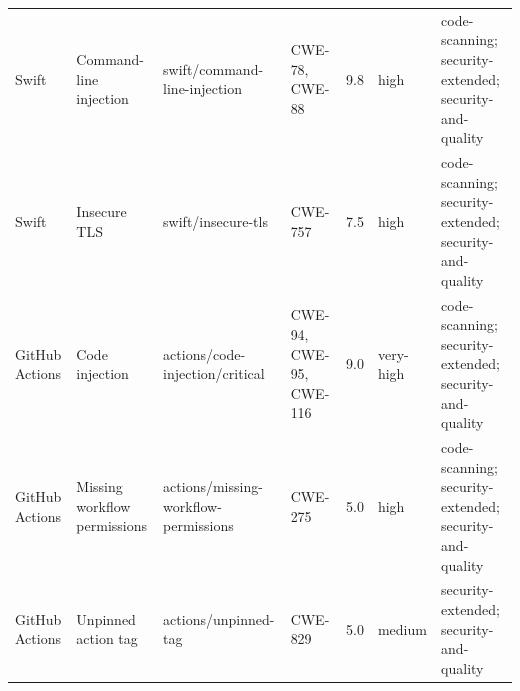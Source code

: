 \documentclass[10pt,letterpaper]{article}
\begin{document}
\begin{landscape}
\begin{longtable}{@{}P{0.9in}P{1.25in}P{1.85in}P{1.0in}P{0.7in}P{0.55in}P{2.15in}@{}}
Swift & Command-line injection & swift/command-line-injection & CWE-78, CWE-88 & 9.8 & high & code-scanning; security-extended; security-and-quality\\
Swift & Insecure TLS & swift/insecure-tls & CWE-757 & 7.5 & high & code-scanning; security-extended; security-and-quality\\
GitHub Actions & Code injection & actions/code-injection/critical & CWE-94, CWE-95, CWE-116 & 9.0 & very-high & code-scanning; security-extended; security-and-quality\\
GitHub Actions & Missing workflow permissions & actions/missing-workflow-permissions & CWE-275 & 5.0 & high & code-scanning; security-extended; security-and-quality\\
GitHub Actions & Unpinned action tag & actions/unpinned-tag & CWE-829 & 5.0 & medium & security-extended; security-and-quality\\
\bottomrule
\end{longtable}
\end{landscape}
\end{document}
